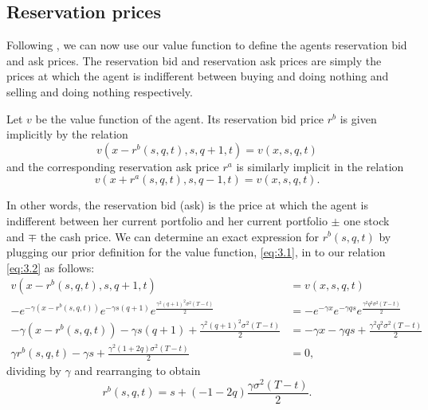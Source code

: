 \subsection*{Reservation prices}

Following \textcite{AS2008}, we can now use our value function to define the agents 
reservation bid and ask prices.
The reservation bid and reservation ask prices are simply the prices at which the agent
is indifferent between buying and doing nothing and selling and doing nothing respectively. 

\begin{definition}\label{def:3.3.1}
    Let $v$ be the value function of the agent. Its reservation bid price $r^b$ is
    given implicitly by the relation
    \begin{equation}\label{eq:3.2}
        v(x-r^b(s,q,t),s,q+1,t)=v(x,s,q,t)
    \end{equation}
    and the corresponding reservation ask price $r^a$ is similarly implicit in the 
    relation
    \begin{equation}\label{eq:3.3}
        v(x+r^a(s,q,t),s,q-1,t)=v(x,s,q,t).
    \end{equation}
\end{definition}

In other words, the reservation
bid (ask) is the price at which the agent is indifferent between her current portfolio
and her current portfolio $\pm$ one stock and $\mp$ the cash price.
We can determine an exact expression for $r^b(s,q,t)$ by plugging our prior definition
for the value function, \eqref{eq:3.1}, in to our relation \eqref{eq:3.2} as follows:
\begin{align*}
    v(x-r^b(s,q,t),s,q+1,t)&=v(x,s,q,t)\\
    -e^{-\gamma(x-r^b(s,q,t))}e^{-\gamma s(q+1)}e^{\frac{\gamma^2(q+1)^2\sigma^2(T-t)}{2}}&=-e^{-\gamma x}e^{-\gamma q s}e^{\frac{\gamma^2q^2\sigma^2(T-t)}{2}}\\
    -\gamma(x-r^b(s,q,t))-\gamma s(q+1) + \frac{\gamma^2(q+1)^2\sigma^2(T-t)}{2} &= -\gamma x-\gamma q s + \frac{\gamma^2q^2\sigma^2(T-t)}{2}\\
    \gamma r^b(s,q,t)-\gamma s + \frac{\gamma^2(1+2q)\sigma^2(T-t)}{2} &=0,
\end{align*}
dividing by $\gamma$ and rearranging to obtain
\begin{equation}
    r^b(s,q,t)=s+(-1-2q)\frac{\gamma\sigma^2(T-t)}{2}.
\end{equation}

